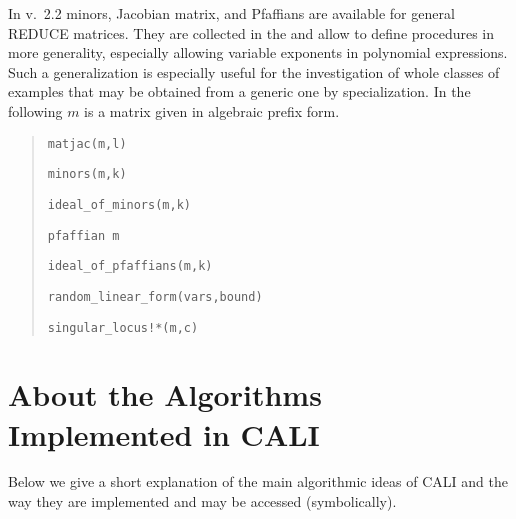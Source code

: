 In v.\ 2.2 minors, Jacobian matrix, and Pfaffians are available for
general REDUCE matrices. They are collected in the  and allow to define procedures in more generality, especially
allowing variable exponents in polynomial expressions. Such a
generalization is especially useful for the investigation of whole
classes of examples that may be obtained from a generic one by
specialization. In the following $m$ is a matrix given in algebraic
prefix form.
\begin{quote}
\verb|matjac(m,l)|


\verb|minors(m,k)|


\verb|ideal_of_minors(m,k)|


\verb|pfaffian m|


\verb|ideal_of_pfaffians(m,k)|


\verb|random_linear_form(vars,bound)|


\verb|singular_locus!*(m,c)|

\end{quote}

\section{About the Algorithms Implemented in CALI}

Below we give a short explanation of the main algorithmic ideas of
CALI and the way they are implemented and may be accessed
(symbolically).


